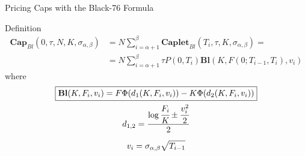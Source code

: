 \documentclass{beamer}
\begin{document}
%		
%
%
%
%

\begin{frame}{Pricing Caps with the Black-76 Formula}
	\begin{block}{Definition}
	\begin{equation}
		\begin{aligned}
		\textbf{Cap}_{Bl}(0, \tau,N,K,\sigma_{\alpha,\beta}) &= N\sum_{i=\alpha+1}^{\beta}\textbf{Caplet}_{Bl}(T_i, \tau,K,\sigma_{\alpha,\beta}) = \\ &=N\sum_{i=\alpha+1}^{\beta}\tau P(0,T_i) \textbf{Bl}(K,F(0;T_{i-1},T_i),v_i)
		\end{aligned}
		\label{eq:cap_black}
	\end{equation}
	where
	\begin{equation*}
		\begin{gathered}
			\boxed{\textbf{Bl}(K,F_i,v_i)=F\Phi(d_1(K,F_i,v_i)) - K\Phi(d_2(K,F_i,v_i))} \\
			d_{1,2} = \frac{\log{\cfrac{F_i}{K}} \pm \cfrac{v_i^2}{2}}{2} \\[0.2cm]
			v_i = \sigma_{\alpha,\beta}\sqrt{T_{i-1}}
		\end{gathered}
	\end{equation*}
	\end{block}
\end{frame}
\end{document}
